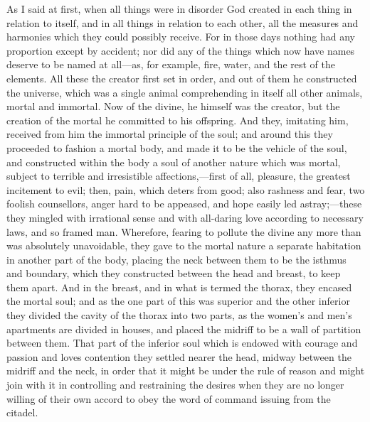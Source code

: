As I said at first, when all things were in disorder God created in each
thing in relation to itself, and in all things in relation to each other,
all the measures and harmonies which they could possibly receive. For in
those days nothing had any proportion except by accident; nor did any of
the things which now have names deserve to be named at all—as, for
example, fire, water, and the rest of the elements. All these the creator
first set in order, and out of them he constructed the universe, which was
a single animal comprehending in itself all other animals, mortal and
immortal. Now of the divine, he himself was the creator, but the creation
of the mortal he committed to his offspring. And they, imitating him,
received from him the immortal principle of the soul; and around this they
proceeded to fashion a mortal body, and made it to be the vehicle of the
soul, and constructed within the body a soul of another nature which was
mortal, subject to terrible and irresistible affections,—first of
all, pleasure, the greatest incitement to evil; then, pain, which deters
from good; also rashness and fear, two foolish counsellors, anger hard to
be appeased, and hope easily led astray;—these they mingled with
irrational sense and with all-daring love according to necessary laws, and
so framed man. Wherefore, fearing to pollute the divine any more than was
absolutely unavoidable, they gave to the mortal nature a separate
habitation in another part of the body, placing the neck between them to
be the isthmus and boundary, which they constructed between the head and
breast, to keep them apart. And in the breast, and in what is termed the
thorax, they encased the mortal soul; and as the one part of this was
superior and the other inferior they divided the cavity of the thorax into
two parts, as the women’s and men’s apartments are divided in houses, and
placed the midriff to be a wall of partition between them. That part of
the inferior soul which is endowed with courage and passion and loves
contention they settled nearer the head, midway between the midriff and
the neck, in order that it might be under the rule of reason and might
join with it in controlling and restraining the desires when they are no
longer willing of their own accord to obey the word of command issuing
from the citadel.

